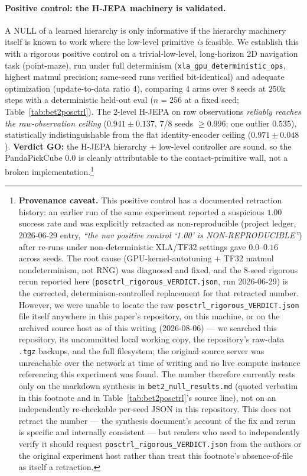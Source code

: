\documentclass{article}
\begin{document}
\paragraph{Positive control: the H-JEPA machinery is validated.}
A NULL of a learned hierarchy is only informative if the hierarchy machinery
itself is known to work where the low-level primitive \emph{is} feasible. We
establish this with a rigorous positive control on a trivial-low-level,
long-horizon 2D navigation task (point-maze), run under full determinism
(\texttt{xla\_gpu\_deterministic\_ops}, highest matmul precision; same-seed runs
verified bit-identical) and adequate optimization (update-to-data ratio $4$),
comparing $4$ arms over $8$ seeds at $250$k steps with a deterministic held-out
eval ($n{=}256$ at a fixed seed; Table~\ref{tab:bet2posctrl}). The 2-level H-JEPA
on raw observations \emph{reliably reaches the raw-observation ceiling}
($0.941 \pm 0.137$, $7/8$ seeds $\geq 0.996$; one outlier $0.535$), statistically
indistinguishable from the flat identity-encoder ceiling ($0.971 \pm 0.048$).
\textbf{Verdict GO:} the H-JEPA hierarchy + low-level controller are sound, so the
PandaPickCube $0.0$ is cleanly attributable to the contact-primitive wall, not a
broken implementation.\footnote{\label{fn:posctrlprovenance}\textbf{Provenance
caveat.} This positive control has a documented retraction history: an earlier
run of the same experiment reported a suspicious $1.00$ success rate and was
explicitly retracted as non-reproducible (project ledger, 2026-06-29 entry,
\emph{``the nav positive control `1.00' is NON-REPRODUCIBLE''}) after re-runs
under non-deterministic XLA/TF32 settings gave $0.0$--$0.16$ across seeds. The
root cause (GPU-kernel-autotuning + TF32 matmul nondeterminism, not RNG) was
diagnosed and fixed, and the $8$-seed rigorous rerun reported here
(\texttt{posctrl\_rigorous\_VERDICT.json}, run 2026-06-29) is the corrected,
determinism-controlled replacement for that retracted number. However, we were
unable to locate the raw \texttt{posctrl\_rigorous\_VERDICT.json} file itself
anywhere in this paper's repository, on this machine, or on the archived source
host as of this writing (2026-08-06) --- we searched this repository, its
uncommitted local working copy, the repository's raw-data \texttt{.tgz}
backups, and the full filesystem; the original source server was unreachable
over the network at time of writing and no live compute instance referencing
this experiment was found. The number therefore currently rests only on the
markdown synthesis in \texttt{bet2\_null\_results.md} (quoted verbatim in this
footnote and in Table~\ref{tab:bet2posctrl}'s source line), not on an
independently re-checkable per-seed JSON in this repository. This does not
retract the number --- the synthesis document's account of the fix and rerun is
specific and internally consistent --- but readers who need to independently
verify it should request \texttt{posctrl\_rigorous\_VERDICT.json} from the
authors or the original experiment host rather than treat this footnote's
absence-of-file as itself a retraction.}
\end{document}
